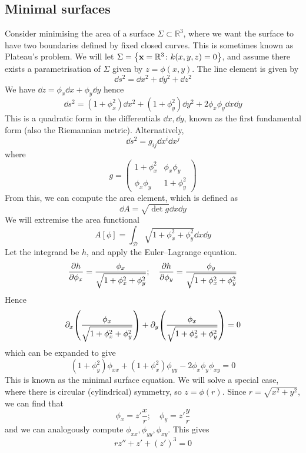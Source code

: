 \subsection{Minimal surfaces}
Consider minimising the area of a surface \( \Sigma \subset \mathbb R^3 \), where we want the surface to have two boundaries defined by fixed closed curves.
This is sometimes known as Plateau's problem.
We will let \( \Sigma = \qty{ \vb x = \mathbb R^3 \colon k(x, y, z) = 0 } \), and assume there exists a parametrisation of \( \Sigma \) given by \( z = \phi(x, y) \).
The line element is given by
\[
	\dd{s}^2 = \dd{x}^2 + \dd{y}^2 + \dd{z}^2
\]
We have \( \dd{z} = \phi_x \dd{x} + \phi_y \dd{y} \) hence
\[
	\dd{s}^2 = ( 1 + \phi_x^2 ) \dd{x}^2 + ( 1 + \phi_y^2 ) \dd{y}^2 + 2 \phi_x \phi_y \dd{x}\dd{y}
\]
This is a quadratic form in the differentials \( \dd{x}, \dd{y} \), known as the first fundamental form (also the Riemannian metric).
Alternatively,
\[
	\dd{s}^2 = g_{ij}\dd{x^i}\dd{x^j}
\]
where
\[
	g = \begin{pmatrix}
		1 + \phi_x^2  & \phi_x \phi_y \\
		\phi_x \phi_y & 1 + \phi_y^2
	\end{pmatrix}
\]
From this, we can compute the area element, which is defined as
\[
	\dd{A} = \sqrt{\det g} \dd{x}\dd{y}
\]
We will extremise the area functional
\[
	A[\phi] = \int_{\mathcal D} \sqrt{1 + \phi_x^2 + \phi_y^2}\dd{x}\dd{y}
\]
Let the integrand be \( h \), and apply the Euler--Lagrange equation.
\[
	\pdv{h}{\phi_x} = \frac{\phi_x}{\sqrt{1 + \phi_x^2 + \phi_y^2}};\quad \pdv{h}{\phi_y} = \frac{\phi_y}{\sqrt{1 + \phi_x^2 + \phi_y^2}}
\]
Hence
\[
	\partial_x \qty(\frac{\phi_x}{\sqrt{1 + \phi_x^2 + \phi_y^2}}) + \partial_y \qty(\frac{\phi_x}{\sqrt{1 + \phi_x^2 + \phi_y^2}}) = 0
\]
which can be expanded to give
\[
	(1 + \phi_y^2)\phi_{xx} + (1 + \phi_x^2)\phi_{yy} - 2 \phi_x \phi_y \phi_{xy} = 0
\]
This is known as the minimal surface equation.
We will solve a special case, where there is circular (cylindrical) symmetry, so \( z = \phi(r) \).
Since \( r = \sqrt{x^2 + y^2} \), we can find that
\[
	\phi_x = z' \frac{x}{r};\quad \phi_y = z' \frac{y}{r}
\]
and we can analogously compute \( \phi_{xx}, \phi_{yy}, \phi_{xy} \).
This gives
\[
	rz'' + z' + (z')^3 = 0
\]

